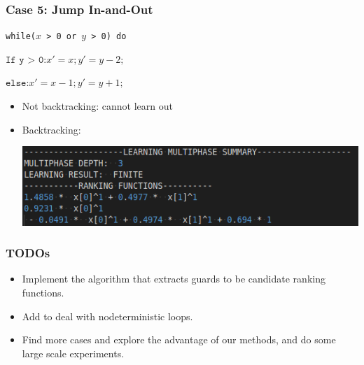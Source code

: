\documentclass[10pt]{beamer}
\begin{document}
\begin{frame}\frametitle{Case 5: Jump In-and-Out}
\begin{example}
\texttt{while($x$ > 0 or $y$ > 0) do }

$\texttt{If y > 0:} x' = x; y' = y - 2;$

$\texttt{else:} x' = x - 1; y' = y + 1;$

\end{example}
\begin{itemize}
\item Not backtracking: cannot learn out

\item Backtracking:
\begin{center}
\includegraphics[scale=0.5]{6.png}
\end{center}
\end{itemize}
\end{frame}


\begin{frame}\frametitle{TODOs}
\begin{itemize}

\item Implement the algorithm that extracts guards to be candidate ranking functions.

\item Add to deal with nodeterministic loops.

\item Find more cases and explore the advantage of our methods, and do some large scale experiments.
\end{itemize}
\end{frame}
\end{document}
